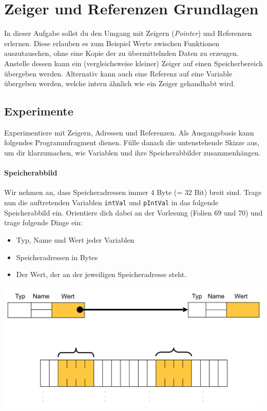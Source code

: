 \section{\ExercisePrefixMemory Zeiger und Referenzen Grundlagen}
\label{sec:pointers}
In dieser Aufgabe sollst du den Umgang mit Zeigern (\emph{Pointer}) und Referenzen erlernen.
Diese erlauben es zum Beispiel Werte zwischen Funktionen auszutauschen, ohne eine Kopie der zu übermittelnden Daten zu erzeugen.
Anstelle dessen kann ein (vergleichsweise kleiner) Zeiger auf einen Speicherbereich übergeben werden.
Alternativ kann auch eine Referenz auf eine Variable übergeben werden, welche intern ähnlich wie ein Zeiger gehandhabt wird.

\subsection{Experimente}
Experimentiere mit Zeigern, Adressen und Referenzen. Als Ausgangsbasis kann folgendes Programmfragment dienen.
Fülle danach die untenstehende Skizze aus, um dir klarzumachen, wie Variablen und ihre Speicherabbilder zusammenhängen.


\paragraph{Speicherabbild}
Wir nehmen an, dass Speicheradressen immer 4 Byte (= 32 Bit) breit sind. 
Trage nun die auftretenden Variablen \lstinline{intVal} und \lstinline{pIntVal} in das folgende Speicherabbild ein. Orientiere dich dabei an der Vorlesung (Folien 69 und 70) und trage folgende Dinge ein:
\begin{itemize}
	\item Typ, Name und Wert jeder Variablen
	\item Speicheradressen in Bytes
	\item Der Wert, der an der jeweiligen Speicheradresse steht.
\end{itemize}

\begin{center}
\includegraphics[width=.9\textwidth]{02_memory/figures/memory_image.png}
\end{center}


